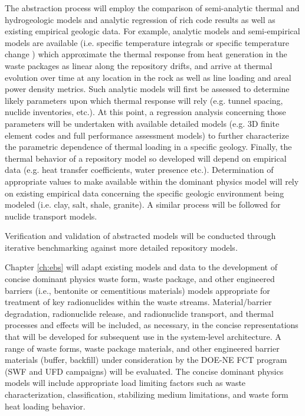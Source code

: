 The abstraction process will employ the comparison of semi-analytic 
thermal and hydrogeologic models and analytic regression of rich code 
results as well as existing empirical geologic data.  For example, 
analytic models and semi-empirical models are available (i.e. specific 
temperature integrals \cite{li_methodology_2004} or specific temperature change 
\cite{radel_wilson_2004}) which approximate the thermal response from 
heat generation in the waste packages as linear along the repository 
drifts, and arrive at thermal evolution over time at any location in 
the rock as well as line loading and areal power density metrics.  
Such analytic models will first be assessed to determine likely 
parameters upon which thermal response will rely (e.g. tunnel spacing, 
nuclide inventories, etc.). At this point, a regression analysis 
concerning those parameters will be undertaken with available detailed 
models (e.g. 3D finite element codes and full performance assessment 
models) to further characterize the parametric dependence of thermal 
loading in a specific geology. Finally, the thermal behavior of a 
repository model so developed will depend on empirical data (e.g.  
heat transfer coefficients, water presence etc.). Determination of 
appropriate values to make available within the dominant physics model 
will rely on existing empirical data concerning the specific geologic 
environment being modeled (i.e. clay, salt, shale, granite). A similar 
process will be followed for nuclide transport models.

Verification and validation of abstracted models will be conducted 
through iterative benchmarking against more detailed repository 
models.

Chapter \ref{ch:ebs} will adapt existing models and data to the 
development of concise dominant physics waste form, waste package, and 
other engineered barriers (i.e., bentonite or cementitious materials) 
models appropriate for treatment of key radionuclides within the waste 
streams.  Material/barrier degradation, radionuclide release, and 
radionuclide transport, and thermal processes and effects will be 
included, as necessary, in the concise representations that will be 
developed for subsequent use in the system-level architecture. A range 
of waste forms, waste package materials, and other engineered barrier 
materials (buffer, backfill) under consideration by the DOE-NE FCT 
program (SWF and UFD campaigns) will be evaluated. The concise 
dominant physics models will include appropriate load limiting factors 
such as waste characterization, classification, stabilizing medium 
limitations, and waste form heat loading behavior.

